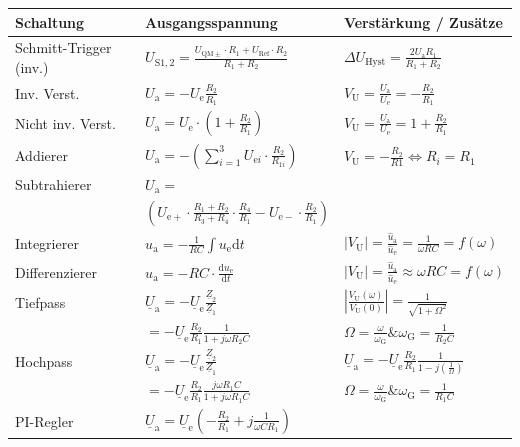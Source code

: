 		\begin{table}[h]
		\begin{tabularx}{\textwidth}{XXX}
		Schaltung & Ausgangsspannung & Verstärkung / Zusätze\\
		\toprule
		Schmitt-Trigger (inv.) & $U_{\mathrm{S}1,2}=\frac{U_{\mathrm{QM}\pm}\cdot R_1+U_{\mathrm{Ref}}\cdot R_2}{R_1+R_2}$
		& $\Delta U_{\mathrm{Hyst}}=\frac{2U_{\mathrm{a}}R_1}{R_1+R_2}$\\
		\midrule
		Inv. Verst. & $U_{\mathrm{a}}=-U_{\mathrm{e}}\frac{R_2}{R_1}$ 
		& $V_{\mathrm{U}}=\frac{U_{\mathrm{a}}}{U_{\mathrm{e}}}=-\frac{R_2}{R_1}$\\
		\midrule
		Nicht inv. Verst. & $U_{\mathrm{a}}=U_{\mathrm{e}}\cdot\left(1+\frac{R_2}{R_1}\right)$ 
		& $V_{\mathrm{U}}=\frac{U_{\mathrm{a}}}{U_{\mathrm{e}}}=1+\frac{R_2}{R_1}$\\
		\midrule
		Addierer & $U_{\mathrm{a}}=-\left(\sum_{i=1}^3 U_{\mathrm{e}i}\cdot\frac{R_2}{R_{1i}}\right)$ 
		& $V_{\mathrm{U}}=-\frac{R_2}{R1} \Leftrightarrow R_i=R_1$\\
		\midrule
		Subtrahierer & $U_{\mathrm{a}}=$ & \\
		& $\left(U_{\mathrm{e}+}\cdot\frac{R_1+R_2}{R_3+R_4}\cdot\frac{R_4}{R_1}-U_{\mathrm{e}-}\cdot\frac{R_2}{R_1}\right)$ &\\
		\midrule
		Integrierer & $u_{\mathrm{a}}=-\frac{1}{RC}\int u_{\mathrm{e}} \mathrm{d}t$ 
		& $|V_{\mathrm{U}}|=\frac{\hat{u}_{\mathrm{a}}}{\hat{u}_{\mathrm{e}}}=\frac{1}{\omega RC}=f(\omega)$\\
		\midrule
		Differenzierer & $u_{\mathrm{a}}=-RC\cdot\frac{\mathrm{d}u_{\mathrm{e}}}{\mathrm{d}t}$ &
		$|V_{\mathrm{U}}|=\frac{\hat{u}_{\mathrm{a}}}{\hat{u}_{\mathrm{e}}}\approx\omega RC=f(\omega)$\\
		\midrule
		Tiefpass & $\underline{U}_{\mathrm{a}}=-\underline{U}_{\mathrm{e}}\frac{\underline{Z}_2}{\underline{Z}_1}$ 
		& $\left|\frac{V_{\mathrm{U}}(\omega)}{V_{\mathrm{U}}(0)}\right|=\frac{1}{\sqrt{1+\Omega^2}}$\\
		& $=-\underline{U}_{\mathrm{e}}\frac{R_2}{R_1}\frac{1}{1+j\omega R_2C}$ & $\Omega=\frac{\omega}{\omega_{\mathrm{G}}} \& \omega_{\mathrm{G}}=\frac{1}{R_2C}$\\
		\midrule
		Hochpass & $\underline{U}_{\mathrm{a}}=-\underline{U}_{\mathrm{e}}\frac{\underline{Z}_2}{\underline{Z}_1}$ 
		& $\underline{U}_{\mathrm{a}}=-\underline{U}_{\mathrm{e}}\frac{R_2}{R_1}\frac{1}{1-j\left(\frac{1}{\Omega}\right)}$ \\
		& $=-\underline{U}_{\mathrm{e}}\frac{R_2}{R_1}\frac{j\omega R_1C}{1+j\omega R_1C}$ & $\Omega=\frac{\omega}{\omega_{\mathrm{G}}}\&\omega_{\mathrm{G}}=\frac{1}{R_1C}$ \\
		\midrule
		PI-Regler & $\underline{U}_{\mathrm{a}}=\underline{U}_{\mathrm{e}}\left(-\frac{R_2}{R_1}+j\frac{1}{\omega C R_1}\right)$ &\\
		\bottomrule
		\end{tabularx}
		\end{table}

